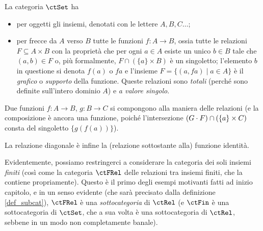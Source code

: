 \begin{example}\label{ex_cat_insiemi}
 La categoria \(\ctSet\) ha
 \begin{itemize}
  \item per oggetti gli insiemi, denotati con le lettere \(A,B,C\dots\);
  \item per frecce da \(A\) verso \(B\) tutte le funzioni \(f \colon A\to B\), ossia tutte le relazioni \(F\subseteq A\times B\) con la proprietà che per ogni \(a\in A\) esiste un unico \(b\in B\) tale che \((a,b)\in F\) o, più formalmente, \(F\cap(\{a\}\times B)\) è un singoletto; l'elemento \(b\) in questione si denota \(f(a)\) o \(fa\) e l'insieme \(F = \{(a,fa)\mid a\in A\}\) è il \emph{grafico} o \emph{supporto} della funzione. Queste relazioni sono \emph{totali} (perché sono definite sull'intero dominio \(A\)) e \emph{a valore singolo}.
 \end{itemize}
 Due funzioni \(f \colon A\to B\), \(g \colon B\to C\) si compongono alla maniera delle relazioni (e la composizione è ancora una funzione, poiché l'intersezione \((G\cdot F)\cap (\{a\}\times C)\) consta del singoletto \(\{g(f(a))\}\)).

 La relazione diagonale è infine la (relazione sottostante alla) funzione identità.
\end{example}
Evidentemente, possiamo restringerci a considerare la categoria dei soli insiemi \emph{finiti} (così come la categoria \(\ctFRel\) delle relazioni tra insiemi finiti, che la contiene propriamente). Questo è il primo degli esempi motivanti fatti ad inizio capitolo, e in un senso evidente (che sarà precisato dalla definizione \ref{def_subcat}), \(\ctFRel\) è una \emph{sottocategoria} di \(\ctRel\) (e \(\ctFin\) è una sottocategoria di \(\ctSet\), che a sua volta è una sottocategoria di \(\ctRel\), sebbene in un modo non completamente banale).
